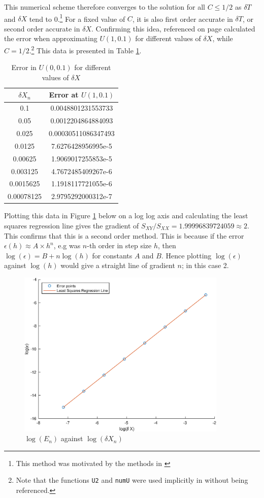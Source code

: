 \documentclass[10pt,a4paper,notitlepage]{article}
\begin{document}
This numerical scheme therefore converges to the solution for all $C\leq 1/2$ as $\delta T$ and $\delta X$ tend to 0.\footnote{This method was motivated by the methods in \cite{AMES199250}} For a fixed value of $C$, it is also first order accurate in $\delta T$, or second order accurate in $\delta X$. 
Confirming this idea,  referenced on page \pageref{cd:3.2} calculated the error when approximating $U(1,0.1)$ for different values of $\delta X$, while $C=1/2$.\footnote{Note that the functions \texttt{U2} and \texttt{numU} were used implicitly in  without being referenced.} This data is presented in Table \ref{tb:accurateerror}. 
\begin{table}[H]
\centering
\begin{tabular}{|c|c|} \hline $\delta X_{n}$ & Error at $U(1,0.1)$\\ \hline 0.1 & 0.0048801231553733\\ 0.05 & 0.0012204864884093\\ 0.025 & 0.00030511086347493\\ 0.0125 & 7.6276428956995e-5\\ 0.00625 & 1.9069017255853e-5\\ 0.003125 & 4.7672485409267e-6\\ 0.0015625 & 1.1918117721055e-6\\ 0.00078125 & 2.9795292000312e-7 \\ \hline
\end{tabular}
\caption{Error in $U(0,0.1)$ for different values of $\delta X$}
\label{tb:accurateerror}
\end{table}
Plotting this data in Figure \ref{fg:AccurateError1} below on a log log axis and calculating the least squares regression line gives the gradient of $S_{XY}/S_{XX}=1.99996839724059\approx 2$.  This confirms that this is a second order method. This is because if the error $\epsilon\left(h\right)\approx A\times h^{n}$, e.g was $n$-th order in step size $h$, then $\log\left(\epsilon\right)=B+n\log\left(h\right)$ for constants $A$ and $B$. Hence plotting $\log\left(\epsilon\right)$ against $\log\left(h\right)$ would give a straight line of gradient $n$; in this case 2. 
\begin{figure}[H]
\centering
\includegraphics[width=10cm]{Image_3_1_Order_Of_Accuracy}
\caption{$\log\left(E_{n}\right)$ against $\log\left(\delta X_{n}\right)$}
\label{fg:AccurateError1}
\end{figure}
\end{document}
